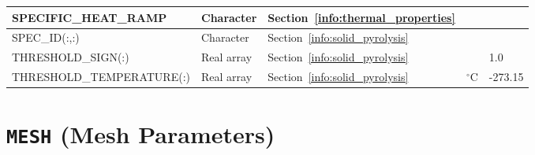 \documentclass[11pt]{book}
\begin{document}
\begin{longtable}{@{\extracolsep{\fill}}|l|l|l|l|l|}
{\ct SPECIFIC\_HEAT\_RAMP}          & Character     & Section~\ref{info:thermal_properties} &                   &        \\ \hline
{\ct SPEC\_ID(:,:)}                 & Character     & Section~\ref{info:solid_pyrolysis}    &                   &        \\ \hline
{\ct THRESHOLD\_SIGN(:)}            & Real array    & Section~\ref{info:solid_pyrolysis}    &                   & 1.0    \\ \hline
{\ct THRESHOLD\_TEMPERATURE(:)}     & Real array    & Section~\ref{info:solid_pyrolysis}    & $^\circ$C         & -273.15 \\ \hline
\end{longtable}

\vspace{\baselineskip}



\section{\texorpdfstring{{\tt MESH}}{MESH} (Mesh Parameters)}
\end{document}
